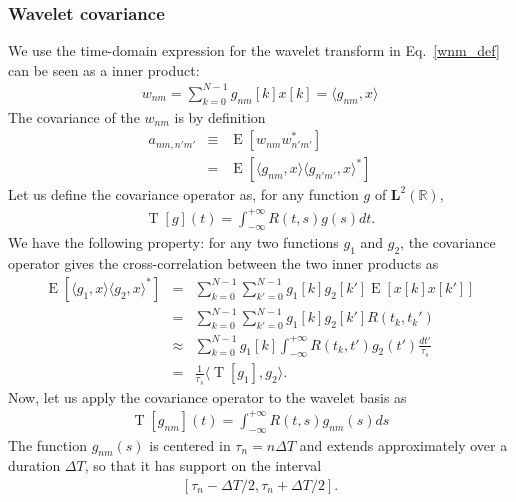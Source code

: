 \documentclass{article}
\begin{document}
\subsubsection{\label{sec:wavelet_covariance}Wavelet covariance}
We use the time-domain expression for the wavelet transform in Eq.~\eqref{wnm_def} can be seen as a inner product:
\begin{eqnarray}
    w_{n m} = \sum_{k=0}^{N-1} g_{nm}[k] x[k] = \langle g_{nm}, x \rangle
\end{eqnarray}
The covariance of the $w_{nm}$ is by definition
\begin{eqnarray}
    a_{nm, n'm'} & \equiv & \operatorname{E}\left[w_{n m} w_{n' m'}^{\ast}\right] \nonumber \\
    & = & \operatorname{E}\left[ \langle g_{n m} , x \rangle \langle g_{n' m'}, x \rangle^{\ast} \right]
\end{eqnarray}
Let us define the covariance operator as, for any function $g$ of $\mathbf{L}^{2}(\mathbb{R})$,
\begin{eqnarray}
    \operatorname{T}[g](t) = \int_{-\infty}^{+\infty} R(t, s) g(s) dt .
\end{eqnarray}
We have the following property: for any two functions $g_1$ and $g_2$, the covariance operator gives the cross-correlation between the two inner products as
\begin{eqnarray}
\label{eq:cov_operator_property}
    \operatorname{E}\left[ \langle g_{1} , x \rangle \langle g_{2}, x \rangle^{\ast} \right] & = & \sum_{k=0}^{N-1}\sum_{k'=0}^{N-1} g_{1}[k] g_{2}[k'] \operatorname{E}\left[ x[k] x[k'] \right] \nonumber \\
    & = & \sum_{k=0}^{N-1}\sum_{k'=0}^{N-1} g_{1}[k] g_{2}[k'] R(t_k, t_k') \nonumber \\
    & \approx & \sum_{k=0}^{N-1} g_{1}[k]  \int_{-\infty}^{+\infty}  R(t_k, t') g_{2}(t') \frac{dt'}{\tau_s} \nonumber \\
    & = & \frac{1}{\tau_s} \langle \operatorname{T}[g_1], g_2 \rangle .
\end{eqnarray}
Now, let us apply the covariance operator to the wavelet basis as
\begin{eqnarray}
    \operatorname{T}[g_{nm}](t) = \int_{-\infty}^{+\infty} R(t, s) g_{nm}(s) ds
\end{eqnarray}
The function $g_{nm}(s)$ is centered in $\tau_n = n \Delta T$ and extends approximately over a duration $ \Delta T$, so that it has support on the interval 
\begin{eqnarray}
    \left[ \tau_n - \Delta T / 2, \tau_n + \Delta T / 2 \right].
\end{eqnarray}
\end{document}
